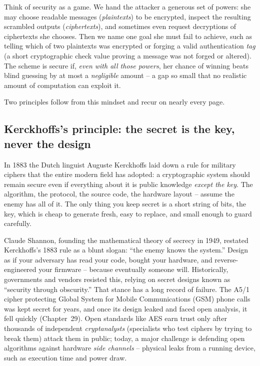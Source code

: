 \begin{intuitionbox}
Think of security as a game. We hand the attacker a generous set of powers: she may choose readable messages (\emph{plaintexts}) to be encrypted, inspect the resulting scrambled outputs (\emph{ciphertexts}), and sometimes even request decryptions of ciphertexts she chooses. Then we name one goal she must fail to achieve, such as telling which of two plaintexts was encrypted or forging a valid authentication \emph{tag} (a short cryptographic check value proving a message was not forged or altered). The scheme is secure if, \emph{even with all those powers}, her chance of winning beats blind guessing by at most a \emph{negligible} amount -- a gap so small that no realistic amount of computation can exploit it.
\end{intuitionbox}

Two principles follow from this mindset and recur on nearly every page.

\subsection*{Kerckhoffs's principle: the secret is the key, never the design}

In 1883 the Dutch linguist Auguste Kerckhoffs laid down a rule for military ciphers that the entire modern field has adopted: a cryptographic system should remain secure even if everything about it is public knowledge \emph{except the key}. The algorithm, the protocol, the source code, the hardware layout -- assume the enemy has all of it. The only thing you keep secret is a short string of bits, the key, which is cheap to generate fresh, easy to replace, and small enough to guard carefully.

\begin{historybox}
Claude Shannon, founding the mathematical theory of secrecy in 1949, restated Kerckhoffs's 1883 rule as a blunt slogan: ``the enemy knows the system.'' Design as if your adversary has read your code, bought your hardware, and reverse-engineered your firmware -- because eventually someone will. Historically, governments and vendors resisted this, relying on secret designs known as ``security through obscurity.'' That stance has a long record of failure. The A5/1 cipher protecting Global System for Mobile Communications (GSM) phone calls was kept secret for years, and once its design leaked and faced open analysis, it fell quickly (Chapter~29). Open standards like AES earn trust only after thousands of independent \emph{cryptanalysts} (specialists who test ciphers by trying to break them) attack them in public; today, a major challenge is defending open algorithms against hardware \emph{side channels} -- physical leaks from a running device, such as execution time and power draw.
\end{historybox}

